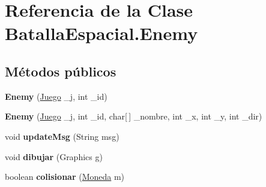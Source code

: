 \hypertarget{classBatallaEspacial_1_1Enemy}{
\section{Referencia de la Clase BatallaEspacial.Enemy}
\label{classBatallaEspacial_1_1Enemy}
}
\subsection*{Métodos públicos}
\begin{DoxyCompactItemize}
\item 
\hypertarget{classBatallaEspacial_1_1Enemy_ab12f55ec1dc5ba5332f025a64b949e25}{
{\bfseries Enemy} (\hyperlink{classBatallaEspacial_1_1Juego}{Juego} \_\-j, int \_\-id)}
\label{classBatallaEspacial_1_1Enemy_ab12f55ec1dc5ba5332f025a64b949e25}

\item 
\hypertarget{classBatallaEspacial_1_1Enemy_a705dcb17f7ae13bd3d129a5e6c555fd4}{
{\bfseries Enemy} (\hyperlink{classBatallaEspacial_1_1Juego}{Juego} \_\-j, int \_\-id, char\mbox{[}$\,$\mbox{]} \_\-nombre, int \_\-x, int \_\-y, int \_\-dir)}
\label{classBatallaEspacial_1_1Enemy_a705dcb17f7ae13bd3d129a5e6c555fd4}

\item 
\hypertarget{classBatallaEspacial_1_1Enemy_a914137816d317c9dd6678eff65b1932f}{
void {\bfseries updateMsg} (String msg)}
\label{classBatallaEspacial_1_1Enemy_a914137816d317c9dd6678eff65b1932f}

\item 
\hypertarget{classBatallaEspacial_1_1Enemy_aa947a44ece780b0158c788f76bbe0c88}{
void {\bfseries dibujar} (Graphics g)}
\label{classBatallaEspacial_1_1Enemy_aa947a44ece780b0158c788f76bbe0c88}

\item 
\hypertarget{classBatallaEspacial_1_1Enemy_adf7fcfc5ebd8d1e4e5b2d03a1e778238}{
boolean {\bfseries colisionar} (\hyperlink{classBatallaEspacial_1_1Moneda}{Moneda} m)}
\label{classBatallaEspacial_1_1Enemy_adf7fcfc5ebd8d1e4e5b2d03a1e778238}

\end{DoxyCompactItemize}
